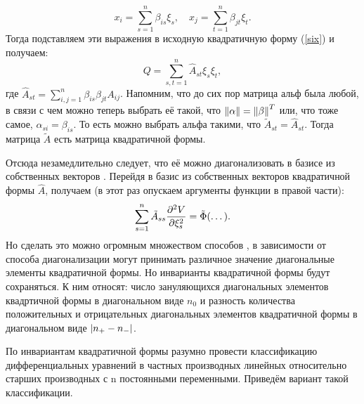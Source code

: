 \documentclass[a4paper,russian]{article}
\begin{document}
\[
	x_i = \sum\limits_{s=1}^{n} \beta_{is} \xi_s,\quad x_j = \sum\limits_{t=1}^{n} \beta_{jt} \xi_t
.\] 
Тогда подставляем эти выражения в исходную квадратичную форму (\ref{six}) и получаем:
\begin{equation}\label{7}
	Q = \sum\limits_{s,t=1}^{n} \hat A_{st} \xi_s \xi_t, 
\end{equation}
где $\hat A_{st} = \sum\limits_{i,j=1}^{n} \beta_{is} \beta_{jt} A_{ij}$. Напомним, что до сих пор матрица альф была любой, в связи с чем можно теперь выбрать её такой, что $\norm{\alpha}=\norm{\beta}^T$ или, что тоже самое, $\alpha_{si} = \beta_{is}$. То есть можно выбрать альфа такими, что $\tilde A_{st} = \hat A_{st}$. Тогда матрица $\tilde A$ есть матрица квадратичной формы.\par
Отсюда незамедлительно следует, что её можно диагонализовать в базисе из собственных векторов \cite{en_lec_2}. Перейдя в базис из собственных векторов квадратичной формы $\hat A$, получаем (в этот раз опускаем аргументы функции в правой части):
\begin{equation}\label{diag}
	\sum\limits_{s=1}^{n}\tilde A_{ss} \pdv[2]{V}{\xi_s} = \tilde \Phi(\dots).
\end{equation}
Но сделать это можно огромным множеством способов \cite{en_lec_2}, в зависимости от способа диагонализации могут принимать различное значение диагональные элементы квадратичной формы. Но инварианты квадратичной формы \cite{en_lec_2} будут сохраняться. К ним относят: число зануляющихся диагональных элементов квадртичной формы в диагональном виде $n_0$ и разность количества положительных и отрицательных диагональных элементов квадратичной формы в диагональном виде $\abs{n_+ - n_-}$.
\par
По инвариантам квадратичной формы разумно провести классификацию дифференциальных уравнений в частных производных линейных относительно старших производных с n постоянными переменными. Приведём вариант такой классификации.\par
\end{document}
